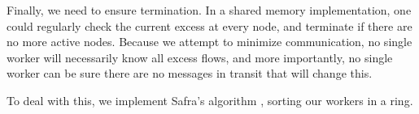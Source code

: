 Finally, we need to ensure termination. In a shared memory implementation, one could regularly check the current excess at every node, and terminate if there are no more active nodes. Because we attempt to minimize communication, no single worker will necessarily know all excess flows, and more importantly, no single worker can be sure there are no messages in transit that will change this.

To deal with this, we implement Safra's algorithm \cite{fokkink2013distributed}, sorting our workers in a ring.
